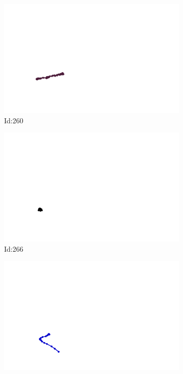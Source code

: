 \documentclass[12pt,twoside]{report}
\begin{document}
\begin{figure}
\centering
\begin{subfigure}[b]{0.20\textwidth}
\centering
\includegraphics[width=\textwidth]{../../trajectories/260.png}
\caption{Id:260}
\end{subfigure}
\begin{subfigure}[b]{0.20\textwidth}
\centering
\includegraphics[width=\textwidth]{../../trajectories/266.png}
\caption{Id:266}
\end{subfigure}
\begin{subfigure}[b]{0.20\textwidth}
\centering
\includegraphics[width=\textwidth]{../../trajectories/270.png}

\end{subfigure}
\end{figure}
\end{document}
